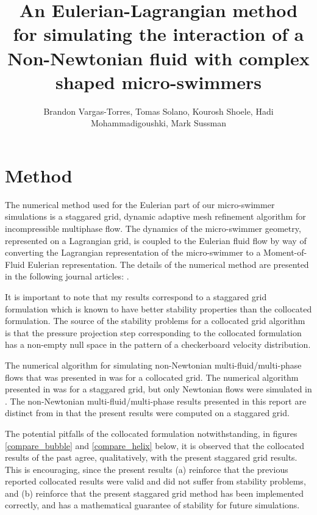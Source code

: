 \documentclass[]{article}
\title{An Eulerian-Lagrangian method for simulating the interaction of a 
 Non-Newtonian fluid with complex shaped micro-swimmers}
\author{Brandon Vargas-Torres,
   Tomas Solano, Kourosh Shoele, Hadi Mohammadigoushki, Mark Sussman}
\begin{document}
\maketitle
\vspace*{-10mm}
\section{Method} 
The numerical method used for the Eulerian part of
our micro-swimmer simulations is a staggared
grid, dynamic adaptive mesh refinement algorithm for 
incompressible multiphase flow.  
The dynamics of the micro-swimmer geometry, represented on a 
Lagrangian grid, is coupled to the Eulerian fluid flow by way of converting
the Lagrangian representation of the micro-swimmer to a
Moment-of-Fluid Eulerian representation.  The details of the numerical method
are presented in the following journal articles: 
\cite{dyadechko2005moment,ArientiSussman2014,peihierarchical,OHTA201966}.

It is important to note that my results correspond to a staggared grid 
formulation which is known to have better stability properties than the
collocated formulation\cite{rhie1983numerical}.  
The source of the stability problems for a collocated grid algorithm
is that the pressure projection step corresponding
to the collocated formulation has a non-empty null space in the pattern of
a checkerboard velocity distribution.

The numerical algorithm
for simulating non-Newtonian multi-fluid/multi-phase flows that was
presented in \cite{OHTA201966} was for a collocated grid.  The numerical
algorithm presented in \cite{peihierarchical} was for a staggared grid,
but only Newtonian flows were simulated in \cite{peihierarchical}.
The non-Newtonian multi-fluid/multi-phase results presented in 
this report are distinct from \cite{OHTA201966}
in that the present results were computed on a staggared grid.

The potential pitfalls of the collocated formulation notwithstanding,
in figures \ref{compare_bubble} and
\ref{compare_helix} below, it is observed that the collocated results of the
past agree, qualitatively, with the present staggared grid results.  This
is encouraging, since the present results (a) reinforce that the previous 
reported collocated results were valid and did not suffer from stability 
problems, and (b) reinforce that the present staggared grid method has 
been implemented correctly, and has a mathematical guarantee of 
stability\cite{GUITTET2015215} for future simulations.
\end{document}
